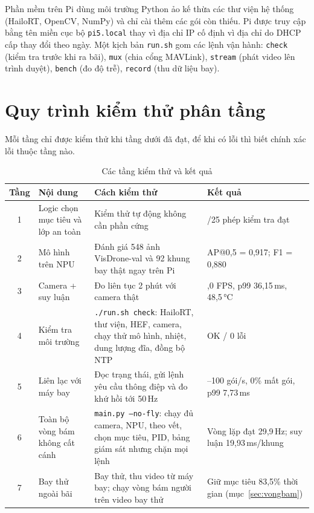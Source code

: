 Phần mềm trên Pi dùng môi trường Python ảo kế thừa các thư viện hệ thống (HailoRT, OpenCV, NumPy) và chỉ cài thêm các gói còn thiếu. Pi được truy cập bằng tên miền cục bộ \texttt{pi5.local} thay vì địa chỉ IP cố định vì địa chỉ do DHCP cấp thay đổi theo ngày. Một kịch bản \texttt{run.sh} gom các lệnh vận hành: \texttt{check} (kiểm tra trước khi ra bãi), \texttt{mux} (chia cổng MAVLink), \texttt{stream} (phát video lên trình duyệt), \texttt{bench} (đo độ trễ), \texttt{record} (thu dữ liệu bay).

\section{Quy trình kiểm thử phân tầng}

Mỗi tầng chỉ được kiểm thử khi tầng dưới đã đạt, để khi có lỗi thì biết chính xác lỗi thuộc tầng nào.

\begin{table}[H]
\centering
\caption{Các tầng kiểm thử và kết quả}
\label{tab:tangkiemthu}
\small
\renewcommand{\arraystretch}{1.15}
\begin{tabularx}{\textwidth}{@{}c>{\raggedright\arraybackslash}p{3.8cm}>{\raggedright\arraybackslash}X>{\raggedright\arraybackslash}p{3.4cm}@{}}
\toprule
\textbf{Tầng} & \textbf{Nội dung} & \textbf{Cách kiểm thử} & \textbf{Kết quả}\\
\midrule
1 & Logic chọn mục tiêu và lớp an toàn & Kiểm thử tự động không cần phần cứng & 25/25 phép kiểm tra đạt\\
2 & Mô hình trên NPU & Đánh giá 548 ảnh VisDrone-val và 92 khung bay thật ngay trên Pi & AP@0,5 = 0,917; F1 = 0,880\\
3 & Camera + suy luận & Đo liên tục 2 phút với camera thật & 30,0 FPS, p99 36,15\,ms, 48,5\,°C\\
4 & Kiểm tra môi trường & \texttt{./run.sh check}: HailoRT, thư viện, HEF, camera, chạy thử mô hình, nhiệt, dung lượng đĩa, đồng bộ NTP & 10 OK / 0 lỗi\\
5 & Liên lạc với máy bay & Đọc trạng thái, gửi lệnh yêu cầu thông điệp và đo khứ hồi tới 50\,Hz & 94--100 gói/s, 0\% mất gói, p99 7,73\,ms\\
6 & Toàn bộ vòng bám không cất cánh & \texttt{main.py --no-fly}: chạy đủ camera, NPU, theo vết, chọn mục tiêu, PID, bảng giám sát nhưng chặn mọi lệnh & Vòng lặp đạt 29,9\,Hz; suy luận 19,93\,ms/khung\\
7 & Bay thử ngoài bãi & Bay thử, thu video từ máy bay; chạy vòng bám người trên video bay thử & Giữ mục tiêu 83,5\% thời gian (mục~\ref{sec:vongbam})\\
\bottomrule
\end{tabularx}
\end{table}

